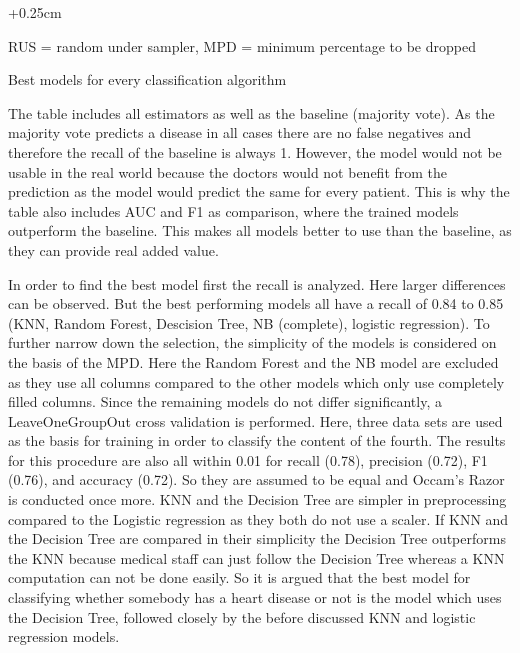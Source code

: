\begin{table}[h]
\begin{adjustwidth}{-0.25cm}{}
\begin{footnotesize}
		 \begin{adjustwidth}{+0.25cm}{}
		\begin{center}
			\centering
			RUS = random under sampler, MPD = minimum percentage to be dropped
		\end{center}
		\end{adjustwidth}
	\end{footnotesize}
	\caption{Best models for every classification algorithm}
	\label{table:modelresults}

	 \end{adjustwidth}
\end{table}

The table includes all estimators as well as the baseline (majority vote). 
As the majority vote predicts a disease in all cases there are no false negatives and therefore the recall of the baseline is always 1. However, the model would not be usable in the real world because the doctors would not benefit from the prediction as the model would predict the same for every patient. This is why the table also includes AUC and F1 as comparison, where the trained models outperform the baseline. This makes all models better to use than the baseline, as they can provide real added value. 

In order to find the best model first the recall is analyzed. Here larger differences can be observed. But the best performing models all have a recall of 0.84 to 0.85 (KNN, Random Forest, Descision Tree, NB (complete), logistic regression).  To further narrow down the selection, the simplicity of the models is considered on the basis of the MPD. Here the Random Forest and the NB model are excluded as they use all columns compared to the other models which only use completely filled columns. Since the remaining models do not differ significantly, a LeaveOneGroupOut cross validation is performed. Here, three data sets are used as the basis for training in order to classify the content of the fourth. The results for this procedure are also all within 0.01 for recall (0.78), precision (0.72), F1 (0.76), and accuracy (0.72). So they are assumed to be equal and Occam's Razor is conducted once more. KNN and the Decision Tree are simpler in preprocessing compared to the Logistic regression as they both do not use a scaler. If KNN and the Decision Tree are compared in their simplicity the Decision Tree outperforms the KNN because medical staff can just follow the Decision Tree whereas a KNN computation can not be done easily. 
So it is argued that the best model for classifying whether somebody has a heart disease or not is the model which uses the Decision Tree, followed closely by the before discussed KNN and logistic regression models.


